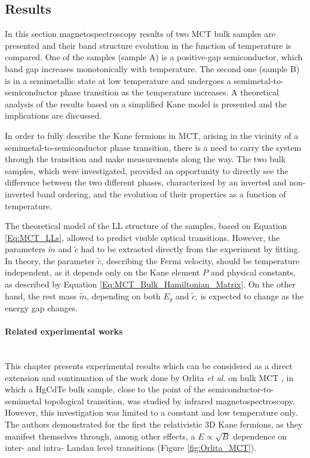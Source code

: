 \documentclass[titlepage,a4paper]{book}
\newcommand{\wciecie}{\quad\phantom{v}}
\newcommand{\myparagraph}[1]{\paragraph{#1}\mbox{}\\}
\begin{document}
\subsection{Results}
\label{sec:MCT_bulk}
\wciecie
In this section magnetospectroscopy results of two MCT bulk samples are presented and their band structure evolution in the function of temperature is compared. One of the samples (sample A) is a positive-gap semiconductor, which band gap increases monotonically with temperature. The second one (sample B) is in a semimetallic state at low temperature and undergoes a semimetal-to-semiconductor phase transition as the temperature increases. A theoretical analysis of the results based on a simplified Kane model is presented and the implications are discussed.

In order to fully describe the Kane fermions in MCT, arising in the vicinity of a semimetal-to-semiconductor phase transition, there is a need to carry the system through the transition and make measurements along the way. The two bulk samples, which were investigated, provided an opportunity to directly see the difference between the two different phases, characterized by an inverted and non-inverted band ordering, and the evolution of their properties as a function of temperature.  

The theoretical model of the LL structure of the samples, based on Equation \ref{Eq:MCT_LLs}, allowed to predict visible optical transitions. However, the parameters $\tilde{m}$ and $\tilde c$ had to be extracted directly from the experiment by fitting. In theory, the parameter $\tilde c$, describing the Fermi velocity, should be temperature independent, as it depends only on the Kane element $P$ and physical constants, as described by Equation \ref{Eq:MCT_Bulk_Hamiltonian_Matrix}. On the other hand, the rest mass $\tilde{m}$, depending on both $E_g$ and $\tilde{c}$, is expected to change as the energy gap changes.

\myparagraph{Related experimental works}
\wciecie
This chapter presents experimental results which can be considered as a direct extension and continuation of the work done by Orlita \textit{et al.} on bulk MCT \cite{Orlita_MCT}, in which a HgCdTe bulk sample, close to the point of the semiconductor-to-semimetal topological transition, was studied by infrared magnetospectroscopy. However, this investigation was limited to a constant and low temperature only. The authors demonstrated for the first the relativistic 3D Kane fermions, as they manifest themselves through, among other effects, a $E \propto \sqrt{B}$ dependence on inter- and intra- Landau level transitions (Figure \ref{fig:Orlita_MCT}). 
\end{document}
